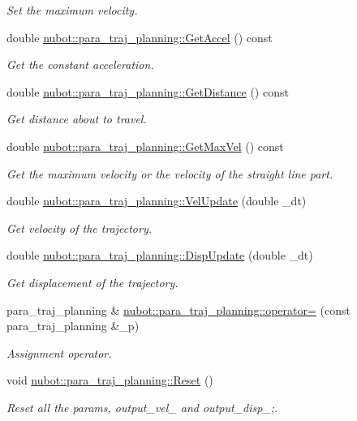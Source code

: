 \begin{DoxyCompactItemize}
\begin{DoxyCompactList}\small\item\em Set the maximum velocity. \end{DoxyCompactList}\item 
double \hyperlink{group__nubot_gaec43c0428c311568c6369d02e12795e8}{nubot\-::para\-\_\-traj\-\_\-planning\-::\-Get\-Accel} () const 
\begin{DoxyCompactList}\small\item\em Get the constant acceleration. \end{DoxyCompactList}\item 
double \hyperlink{group__nubot_gadca3092bc6cfe64f2b7fb09dd66c50c9}{nubot\-::para\-\_\-traj\-\_\-planning\-::\-Get\-Distance} () const 
\begin{DoxyCompactList}\small\item\em Get distance about to travel. \end{DoxyCompactList}\item 
double \hyperlink{group__nubot_ga8c5b225529f70ba36617a81b38f2da61}{nubot\-::para\-\_\-traj\-\_\-planning\-::\-Get\-Max\-Vel} () const 
\begin{DoxyCompactList}\small\item\em Get the maximum velocity or the velocity of the straight line part. \end{DoxyCompactList}\item 
double \hyperlink{group__nubot_ga444ae4938bb69327f99d293fb08b3d4d}{nubot\-::para\-\_\-traj\-\_\-planning\-::\-Vel\-Update} (double \-\_\-dt)
\begin{DoxyCompactList}\small\item\em Get velocity of the trajectory. \end{DoxyCompactList}\item 
double \hyperlink{group__nubot_gae67aeaf943c7db5c12b18ec4d915247b}{nubot\-::para\-\_\-traj\-\_\-planning\-::\-Disp\-Update} (double \-\_\-dt)
\begin{DoxyCompactList}\small\item\em Get displacement of the trajectory. \end{DoxyCompactList}\item 
para\-\_\-traj\-\_\-planning \& \hyperlink{group__nubot_ga8b1a8820091ff8bb12801171ef10d9f2}{nubot\-::para\-\_\-traj\-\_\-planning\-::operator=} (const para\-\_\-traj\-\_\-planning \&\-\_\-p)
\begin{DoxyCompactList}\small\item\em Assignment operator. \end{DoxyCompactList}\item 
void \hyperlink{group__nubot_gaeb7b8fa44365f9b6e81a24214d2556a4}{nubot\-::para\-\_\-traj\-\_\-planning\-::\-Reset} ()
\begin{DoxyCompactList}\small\item\em Reset all the params, output\-\_\-vel\-\_\- and output\-\_\-disp\-\_\-;. \end{DoxyCompactList}\end{DoxyCompactItemize}
